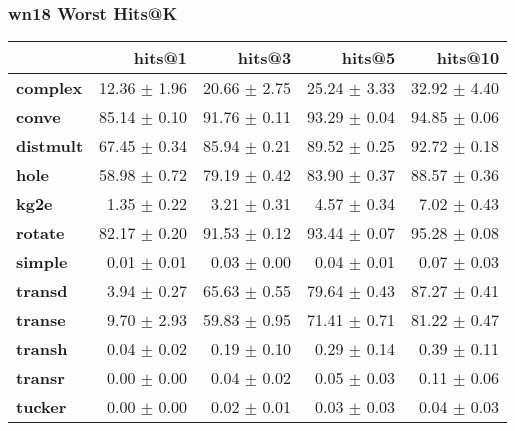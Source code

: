 \documentclass{article}
\begin{document}
\subsubsection{wn18 Worst Hits@K}
    \begin{center}
    \begin{tabular}{lrrrr}
\toprule
{} &        hits@1 &        hits@3 &        hits@5 &       hits@10 \\
\midrule
\textbf{complex } &  12.36 $\pm$ 1.96 &  20.66 $\pm$ 2.75 &  25.24 $\pm$ 3.33 &  32.92 $\pm$ 4.40 \\
\textbf{conve   } &  85.14 $\pm$ 0.10 &  91.76 $\pm$ 0.11 &  93.29 $\pm$ 0.04 &  94.85 $\pm$ 0.06 \\
\textbf{distmult} &  67.45 $\pm$ 0.34 &  85.94 $\pm$ 0.21 &  89.52 $\pm$ 0.25 &  92.72 $\pm$ 0.18 \\
\textbf{hole    } &  58.98 $\pm$ 0.72 &  79.19 $\pm$ 0.42 &  83.90 $\pm$ 0.37 &  88.57 $\pm$ 0.36 \\
\textbf{kg2e    } &   1.35 $\pm$ 0.22 &   3.21 $\pm$ 0.31 &   4.57 $\pm$ 0.34 &   7.02 $\pm$ 0.43 \\
\textbf{rotate  } &  82.17 $\pm$ 0.20 &  91.53 $\pm$ 0.12 &  93.44 $\pm$ 0.07 &  95.28 $\pm$ 0.08 \\
\textbf{simple  } &   0.01 $\pm$ 0.01 &   0.03 $\pm$ 0.00 &   0.04 $\pm$ 0.01 &   0.07 $\pm$ 0.03 \\
\textbf{transd  } &   3.94 $\pm$ 0.27 &  65.63 $\pm$ 0.55 &  79.64 $\pm$ 0.43 &  87.27 $\pm$ 0.41 \\
\textbf{transe  } &   9.70 $\pm$ 2.93 &  59.83 $\pm$ 0.95 &  71.41 $\pm$ 0.71 &  81.22 $\pm$ 0.47 \\
\textbf{transh  } &   0.04 $\pm$ 0.02 &   0.19 $\pm$ 0.10 &   0.29 $\pm$ 0.14 &   0.39 $\pm$ 0.11 \\
\textbf{transr  } &   0.00 $\pm$ 0.00 &   0.04 $\pm$ 0.02 &   0.05 $\pm$ 0.03 &   0.11 $\pm$ 0.06 \\
\textbf{tucker  } &   0.00 $\pm$ 0.00 &   0.02 $\pm$ 0.01 &   0.03 $\pm$ 0.03 &   0.04 $\pm$ 0.03 \\
\bottomrule
\end{tabular}

    \end{center}
\end{document}

